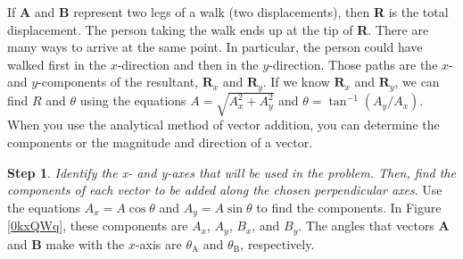 \documentclass[../../main-ap-physics.tex]{subfiles}
\begin{document}
If \textbf{A} and \textbf{B} represent two legs of a walk (two displacements), then \textbf{R} is the total displacement. The person taking the walk ends up at the tip of \textbf{R}. There are many ways to arrive at the same point. In particular, the person could have walked first in the $x$-direction and then in the $y$-direction. Those paths are the $x$- and $y$-components of the resultant, $\textbf{R}_x$ and $\textbf{R}_y$. If we know $\textbf{R}_x$ and $\textbf{R}_y$, we can find $R$ and $\theta$ using the equations $A = \sqrt{A_x^2 + A_y^2}$ and $\theta = \tan^{-1} (A_y/A_x)$. When you use the analytical method of vector addition, you can determine the components or the magnitude and direction of a vector.

\vspace{1em}

\textbf{Step 1}. \textit{Identify the x- and y-axes that will be used in the problem. Then, find the components of each vector to be added along the chosen perpendicular axes}. Use the equations $A_x = A \cos{\theta}$ and $A_y = A \sin{\theta}$ to find the components. In Figure \ref{0kxQWq}, these components are $A_x$, $A_y$, $B_x$, and $B_y$. The angles that vectors \textbf{A} and \textbf{B} make with the $x$-axis are $\theta_{\text{A}}$ and $\theta_{\text{B}}$, respectively.
\end{document}

